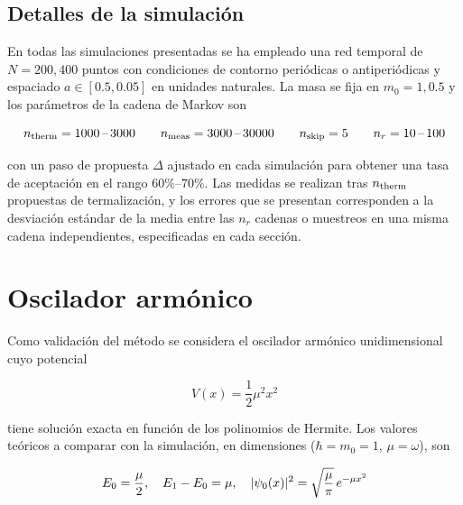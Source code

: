 \documentclass[11pt,a4paper,twoside,pdf]{article}
\numberwithin{equation}{section}
\begin{document}
\subsection{Detalles de la simulación}
\label{params}

En todas las simulaciones presentadas se ha empleado una red temporal de $N = 200, 400$ puntos con condiciones de contorno periódicas o antiperiódicas y espaciado $a \in [0.5, 0.05]$ en unidades naturales. La masa se fija en $m_0 = 1, 0.5$ y los parámetros de la cadena de Markov son

\begin{equation*}
    n_{\rm therm} = 1000 \,\text{--} \, 3000 \qquad n_{\rm meas} = 3000 \, \text{--} \, 30000 \qquad n_{\rm skip} = 5 \qquad n_r =  10 \, \text{--} \, 100
\end{equation*}


con un paso de propuesta $\Delta$ ajustado en cada simulación para obtener una tasa de aceptación en el rango $60\%$--$70\%$. Las medidas se realizan tras $n_{\rm therm}$ propuestas de termalización, y los errores que se presentan corresponden a la desviación estándar de la media entre las $n_r$ cadenas o muestreos en una misma cadena independientes, especificadas en cada sección.
















\section{Oscilador armónico}

Como validación del método se considera el oscilador armónico unidimensional cuyo potencial

\begin{equation}
    V(x) = \frac{1}{2} \mu^2 x^2
\end{equation}

tiene solución exacta en función de los polinomios de Hermite. Los valores teóricos a comparar con la simulación, en dimensiones ($\hbar = m_0 = 1$, $\mu = \omega$), son

\begin{equation}
    E_0 = \frac{\mu}{2}, \quad E_1 - E_0 = \mu, \quad |\psi_0(x)|^2 = \sqrt{\frac{\mu}{\pi}}\, e^{-\mu x^2}
    \notag
\end{equation}
\end{document}
